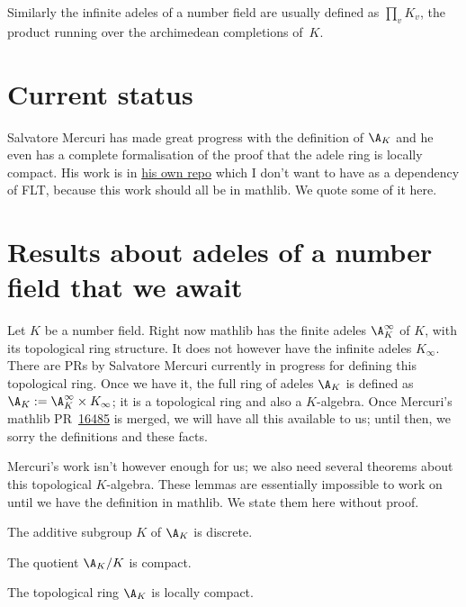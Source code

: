 Similarly the infinite adeles of a number field
are usually defined as $\prod_v K_v$,
the product running over the archimedean completions of~$K$.

\section{Current status}

Salvatore Mercuri has made great progress with the definition of $\A_K$ and he even
has a complete formalisation of the proof that the adele ring is locally compact. His work is in
\href{https://github.com/smmercuri/adele-ring_locally-compact}{his own repo} which
I don't want to have as a dependency of FLT, because this work should all be
in mathlib. We quote some of it here.

\section{Results about adeles of a number field that we await}

Let $K$ be a number field. Right now mathlib has the finite adeles $\A_K^\infty$ of $K$,
with its topological ring structure. It does not however have the infinite adeles $K_\infty$.
There are PRs by Salvatore Mercuri currently
in progress for defining this topological ring. Once we have it, the full ring of
adeles $\A_K$ is defined as $\A_K:=\A_K^\infty\times K_\infty$; it is a topological ring
and also a $K$-algebra. Once Mercuri's mathlib
PR~\href{https://github.com/leanprover-community/mathlib4/pull/16485}{16485} is merged, we will have
all this available to us; until then, we sorry the definitions and these facts.

Mercuri's work isn't however enough for us; we also need several theorems about this topological
$K$-algebra. These lemmas are essentially impossible to work on until we have the definition in
mathlib. We state them here without proof.

\begin{theorem}
  \label{NumberField.AdeleRing.discrete}
  The additive subgroup $K$ of $\A_K$ is discrete.
\end{theorem}

\begin{theorem}
  \label{NumberField.AdeleRing.cocompact}
  The quotient $\A_K/K$ is compact.
\end{theorem}

\begin{theorem}
  \label{NumberField.AdeleRing.locallyCompact}
  The topological ring $\A_K$ is locally compact.
\end{theorem}

